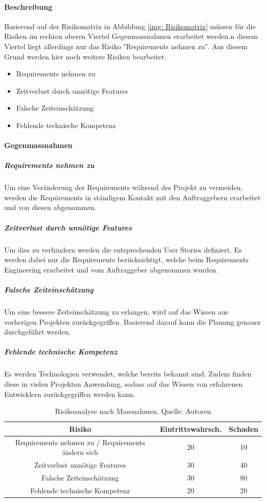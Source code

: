 \paragraph{Beschreibung}
Basierend auf der Risikomatrix in Abbildung \ref{img: Risikomatrix} müssen für die Risiken im rechten oberen Viertel Gegenmassnahmen erarbeitet werden.n diesem Viertel liegt allerdings nur das Risiko "Requirements nehmen zu". Aus diesem Grund werden hier noch weitere Risiken bearbeitet. 
\begin{itemize}
\item Requirements nehmen zu
\item Zeitverlust durch unnötige Features
\item Falsche Zeiteinschätzung
\item Fehlende technische Kompetenz
\end{itemize}

\paragraph{Gegenmassnahmen}
\subparagraph{Requirements nehmen zu}
Um eine Veränderung der Requirements während des Projekt zu vermeiden, werden die Requirements in ständigem Kontakt mit den Auftraggebern erarbeitet und von diesen abgenommen. 
\subparagraph{Zeitverlust durch unnötige Features}
Um dies zu verhindern werden die entsprechenden User Stories definiert. Es werden dabei nur die Requirements berücksichtigt, welche beim Requirements Engineering erarbeitet und vom Auftraggeber abgenommen wurden. 
 \subparagraph{Falsche Zeiteinschätzung}
Um eine bessere Zeiteinschätzung zu erlangen, wird auf das Wissen aus vorherigen Projekten zurückgegriffen. Basierend darauf kann die Planung genauer durchgeführt werden. 
 \subparagraph{Fehlende technische Kompetenz}
Es werden Technologien verwendet, welche bereits bekannt sind. Zudem finden diese in vielen Projekten Anwendung, sodass auf das Wissen von erfahrenen Entwicklern zurückgegriffen werden kann. 

\begin{table}[H]
\begin{tabularx}{\textwidth}{|C|C|C|}
\hline
\textbf{Risiko} & \textbf{Eintrittswahrsch.} & \textbf{Schaden} \\
\hline
Requirements nehmen zu / Requirements ändern sich & 20 & 10\\
\hline
Zeitverlust unnötige Features & 30 & 40\\
\hline
Falsche Zeiteinschätzung &  30 & 80\\
\hline
Fehlende technische Kompetenz & 20 & 20\\
\hline
\end{tabularx}
\caption{ \label{tbl: RisikoanalyseNachMassnahmen}Risikoanalyse nach Massnahmen, Quelle: Autoren}
\end{table}

